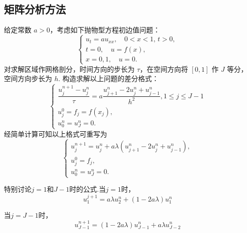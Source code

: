 \subsection{矩阵分析方法}

给定常数 $a > 0$，考虑如下抛物型方程初边值问题：
\begin{equation*}
    \begin{cases}
        u_t = au_{xx}, \quad 0 < x < 1, \, t > 0, \\
        t = 0, \quad u = f(x), \\
        x = 0, 1, \quad u = 0.
    \end{cases}
\end{equation*}
对求解区域作网格剖分，时间方向的步长为 $\tau$，在空间方向将 $[0, 1]$ 作 $J$ 等分，空间方向步长为 $h$. 构造求解以上问题的差分格式：
\begin{equation*}
    \begin{cases}
        \dfrac{u_j^{n+1} - u_j^n}{\tau} = a \dfrac{u_{j+1}^n - 2u_j^n + u_{j-1}^n}{h^2},1\leq j\leq J-1 \\
        u_j^0 = f_j = f(x_j), \\
        u_0^n = u_J^n = 0.
    \end{cases}
\end{equation*}
经简单计算可知以上格式可重写为
\begin{equation}
    \begin{cases}
        u_j^{n+1} = u_j^n + a\lambda \left(u_{j+1}^n - 2u_j^n + u_{j-1}^n\right), \\
        u_j^0 = f_j, \\
        u_0^n = u_J^n = 0.
    \end{cases} \label{eq:matrix_diff}
\end{equation}

特别讨论$j=1$和$J-1$时的公式.当$j=1$时，
\[u_1^{j+1}=a\lambda u_2^n+(1-2a\lambda)u_1^n\]

当$j=J-1$时，
\[u_{J-1}^{n+1}=(1-2a\lambda)u_{J-1}^n+a\lambda u_{J-2}^n\]

